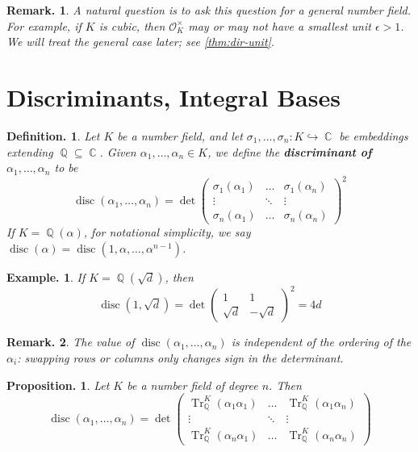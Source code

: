 \documentclass[11pt, a4paper]{memoir}
\DeclareMathOperator{\Q}{{\mathbb{Q}}}
\DeclareMathOperator{\C}{{\mathbb{C}}}
\newcommand{\hto}[0]{\ensuremath{\hookrightarrow}}
\theoremstyle{change}
\newtheorem{proposition}[theorem]{Proposition.}
\theoremstyle{plain}
\theoremstyle{nonumberplain}
\newtheorem{definition}{Definition.}
\newtheorem{example}{Example.}
\newtheorem{remark}{Remark.}
\DeclareMathOperator{\disc}{disc}
\DeclareMathOperator{\Tr}{Tr}
\newcommand{\mbf}[1]{{\boldmath\bfseries #1}}
\numberwithin{equation}{section}
\begin{document}
\begin{remark}
    A natural question is to ask this question for a general number field.
    For example, if $K$ is cubic, then $\mathcal{O}_K^\times$ may or may not have a smallest unit $\epsilon>1$.
    We will treat the general case later; see \cref{thm:dir-unit}.
\end{remark}
\section{Discriminants, Integral Bases}
\begin{definition}
    Let $K$ be a number field, and let $\sigma_1,\ldots,\sigma_n:K\hto\C$ be embeddings extending $\Q\subseteq\C$.
    Given $\alpha_1,\ldots,\alpha_n\in K$, we define the \mbf{discriminant of $\alpha_1,\ldots,\alpha_n$} to be
    \begin{equation*}
        \disc(\alpha_1,\ldots,\alpha_n)=\det
        \begin{pmatrix}
            \sigma_1(\alpha_1) & \hdots & \sigma_1(\alpha_n)\\
            \vdots &\ddots&\vdots\\
            \sigma_n(\alpha_1) & \hdots & \sigma_n(\alpha_n)
        \end{pmatrix}^2
    \end{equation*}
    If $K=\Q(\alpha)$, for notational simplicity, we say $\disc(\alpha)=\disc(1,\alpha,\ldots,\alpha^{n-1})$.
\end{definition}
\begin{example}
    If $K=\Q(\sqrt{d})$, then
    \begin{equation*}\disc(1,\sqrt{d})=\det\begin{pmatrix}1&1\\\sqrt{d}&-\sqrt{d}\end{pmatrix}^2=4d\end{equation*}
\end{example}
\begin{remark}
    The value of $\disc(\alpha_1,\ldots,\alpha_n)$ is independent of the ordering of the $\alpha_i$: swapping rows or columns only changes sign in the determinant.
\end{remark}
\begin{proposition}
    Let $K$ be a number field of degree $n$.
    Then
    \begin{equation*}
        \disc(\alpha_1,\ldots,\alpha_n)=\det
        \begin{pmatrix}
            \Tr_{\Q}^K(\alpha_1\alpha_1)&\hdots&\Tr_{\Q}^K(\alpha_1\alpha_n)\\
            \vdots&\ddots&\vdots\\
            \Tr_{\Q}^K(\alpha_n\alpha_1)&\hdots&\Tr_{\Q}^K(\alpha_n\alpha_n)
        \end{pmatrix}
    \end{equation*}
\end{proposition}
\end{document}
